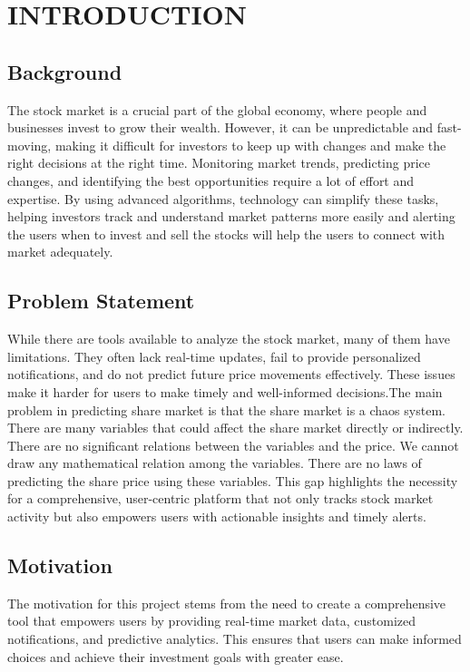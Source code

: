 \chapter{INTRODUCTION}
\section{Background}
The stock market is a crucial part of the global economy, where people and businesses invest to grow their wealth. However, it can be unpredictable and fast-moving, making it difficult for investors to keep up with changes and make the right decisions at the right time. Monitoring market trends, predicting price changes, and identifying the best opportunities require a lot of effort and expertise. By using advanced algorithms, technology can simplify these tasks, helping investors track and understand market patterns more easily and alerting the users when to invest and sell the stocks will help the users to connect with market adequately.



 \section{Problem Statement}
 While there are tools available to analyze the stock market, many of them have limitations. They often lack real-time updates, fail to provide personalized notifications, and do not predict future price movements effectively. These issues make it harder for users to make timely and well-informed decisions.The main problem in predicting share market is that the
share market is a chaos system. There are many variables
that could affect the share market directly or indirectly.
There are no significant relations between the variables and
the price. We cannot draw any mathematical relation
among the variables. There are no laws of predicting the
share price using these variables.
 This gap highlights the necessity for a comprehensive, user-centric platform that not only tracks stock market activity but also empowers users with actionable insights and timely alerts.


\section{Motivation}
The motivation for this project stems from the need to create a comprehensive tool that empowers users by providing real-time market data, customized notifications, and predictive analytics. This ensures that users can make informed choices and achieve their investment goals with greater ease.

